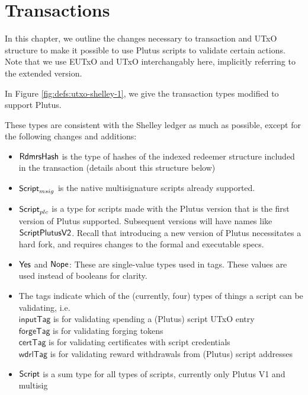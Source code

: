 \section{Transactions}
\label{sec:transactions}

In this chapter, we outline the changes necessary to transaction and
UTxO structure to make it possible to use Plutus scripts to validate
certain actions. Note that we use EUTxO and UTxO interchangably here,
implicitly referring to the extended version.

In Figure \ref{fig:defs:utxo-shelley-1}, we give the transaction types modified
to support Plutus.

These types are consistent with the Shelley ledger
as much as possible,
except for the following changes and additions:

\begin{itemize}
  \item $\mathsf{RdmrsHash}$ is the type of hashes of the indexed redeemer structure
  included in the transaction (details about this structure below)

  \item  $\mathsf{Script}_{msig}$ is the native multisignature scripts already supported.

  \item $\mathsf{Script}_{plc}$ is a type for scripts made with the Plutus version
  that is the first version of Plutus supported. Subsequent versions will
  have names like $\mathsf{ScriptPlutusV2}$. Recall that introducing
  a new version of Plutus necessitates a hard fork, and requires changes
  to the formal and executable specs.

  \item $\mathsf{Yes}$ and $\mathsf{Nope}$: These are single-value types used in tags. These
  values are used instead of booleans for clarity.

  \item The tags indicate which of the (currently, four) types of things a script
  can be validating, i.e. \\
  $\mathsf{inputTag}$ is for validating spending a (Plutus) script UTxO entry \\
  $\mathsf{forgeTag}$ is for validating forging tokens \\
  $\mathsf{certTag}$  is for validating certificates with script credentials  \\
  $\mathsf{wdrlTag}$ is for validating reward withdrawals from (Plutus) script addresses

  \item $\mathsf{Script}$ is a sum type for all types of scripts, currently only
  Plutus V1 and multisig


\end{itemize}
